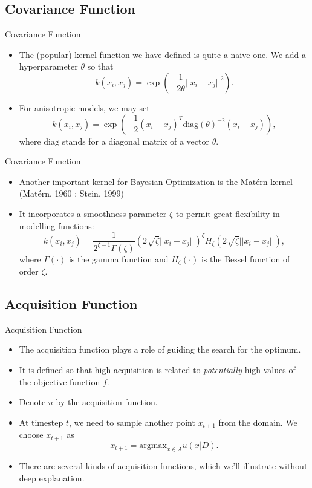\documentclass{beamer}
\begin{document}
\subsection{Covariance Function}
\begin{frame}{Covariance Function}
\begin{itemize}
\item
The (popular) kernel function we have defined is quite a naive one.
We add a \alert{hyperparameter} \(\theta\) so that
\[k(x_i,x_j)=\exp\left(-\frac1{2\theta}||x_i-x_j||^2\right).\]
\item
For anisotropic models, we may set
\[k(x_i,x_j)=\exp\left(-\frac12(x_i-x_j)^T\text{diag}(\theta)^{-2}(x_i-x_j)\right),\]
where \(\text{diag}\) stands for a diagonal matrix of a vector \(\theta\).
\end{itemize}
\end{frame}

\begin{frame}{Covariance Function}
\begin{itemize}
\item
Another important kernel for Bayesian Optimization is the Matérn kernel (Matérn, 1960 ; Stein, 1999)
\item
It incorporates a smoothness parameter \(\zeta\) to permit great flexibility in modelling functions:
\[k(x_i,x_j)=\frac1{2^{\zeta-1}\Gamma(\zeta)}\left(2\sqrt\zeta||x_i-x_j||\right)^\zeta H_\zeta\left(2\sqrt\zeta ||x_i-x_j||\right),\]
where \(\Gamma(\cdot)\) is the gamma function and \(H_\zeta(\cdot)\) is the Bessel function of order \(\zeta\).
\end{itemize}
\end{frame}


\subsection{Acquisition Function}
\begin{frame}{Acquisition Function}
\begin{itemize}
\item
The acquisition function plays a role of guiding the search for the optimum.
\item
It is defined so that high acquisition is related to \emph{potentially} high values of the objective function \(f\).
\item
Denote \(u\) by the acquisition function.
\item
At timestep \(t\), we need to sample another point \(x_{t+1}\) from the domain.
We choose \(x_{t+1}\) as
\[x_{t+1}=\text{argmax}_{x\in A}u(x|D).\]
\item
There are several kinds of acquisition functions, which we'll illustrate without deep explanation.
\end{itemize}
\end{frame}
\end{document}
